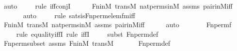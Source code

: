 \begin{isabellebody}
\ auto{\isacharbrackleft}{\kern0pt}{}{\isacharbrackright}{\kern0pt}\isanewline
\ \ \ \ \isamarkupfalse%
{\isacharparenleft}{\kern0pt}rule\ iff{\isacharunderscore}{\kern0pt}conjI{}{\isacharparenright}{\kern0pt}\isanewline
\ \ \ \ \isamarkupfalse%
\ Fn{\isacharunderscore}{\kern0pt}in{\isacharunderscore}{\kern0pt}M\ transM\ nat{\isacharunderscore}{\kern0pt}perms{\isacharunderscore}{\kern0pt}in{\isacharunderscore}{\kern0pt}M\ assms\ pair{\isacharunderscore}{\kern0pt}in{\isacharunderscore}{\kern0pt}M{\isacharunderscore}{\kern0pt}iff\isanewline
\ \ \ \ \ \isamarkupfalse%
\ auto{\isacharbrackleft}{\kern0pt}{}{\isacharbrackright}{\kern0pt}\isanewline
\ \ \ \ \isamarkupfalse%
{\isacharparenleft}{\kern0pt}rule\ sats{\isacharunderscore}{\kern0pt}is{\isacharunderscore}{\kern0pt}Fn{\isacharunderscore}{\kern0pt}perm{\isacharprime}{\kern0pt}{\isacharunderscore}{\kern0pt}elem{\isacharunderscore}{\kern0pt}fm{\isacharunderscore}{\kern0pt}iff{\isacharparenright}{\kern0pt}\isanewline
\ \ \ \ \isamarkupfalse%
\ Fn{\isacharunderscore}{\kern0pt}in{\isacharunderscore}{\kern0pt}M\ transM\ nat{\isacharunderscore}{\kern0pt}perms{\isacharunderscore}{\kern0pt}in{\isacharunderscore}{\kern0pt}M\ assms\ pair{\isacharunderscore}{\kern0pt}in{\isacharunderscore}{\kern0pt}M{\isacharunderscore}{\kern0pt}iff\isanewline
\ \ \ \ \isamarkupfalse%
\ auto\isanewline
\isanewline
\ \ \isamarkupfalse%
\ \isamarkupfalse%
\ {\isachardoublequoteopen}{\isachardot}{\kern0pt}{\isachardot}{\kern0pt}{\isachardot}{\kern0pt}\ {\isacharequal}{\kern0pt}\ Fn{\isacharunderscore}{\kern0pt}perm{\isacharprime}{\kern0pt}{\isacharparenleft}{\kern0pt}f{\isacharparenright}{\kern0pt}{\isachardoublequoteclose}\ \isanewline
\ \ \ \ \isamarkupfalse%
{\isacharparenleft}{\kern0pt}rule\ equality{\isacharunderscore}{\kern0pt}iffI{\isacharcomma}{\kern0pt}\ rule\ iffI{\isacharparenright}{\kern0pt}\isanewline
\ \ \ \ \isamarkupfalse%
{\isacharparenleft}{\kern0pt}subst\ Fn{\isacharunderscore}{\kern0pt}perm{\isacharprime}{\kern0pt}{\isacharunderscore}{\kern0pt}def{\isacharparenright}{\kern0pt}\isanewline
\ \ \ \ \isamarkupfalse%
\ Fn{\isacharunderscore}{\kern0pt}perm{\isacharprime}{\kern0pt}{\isacharunderscore}{\kern0pt}subset\ assms\ Fn{\isacharunderscore}{\kern0pt}in{\isacharunderscore}{\kern0pt}M\ transM\ \isanewline
\ \ \ \ \isamarkupfalse%
\ Fn{\isacharunderscore}{\kern0pt}perm{\isacharprime}{\kern0pt}{\isacharunderscore}{\kern0pt}def\isanewline

\end{isabellebody}
